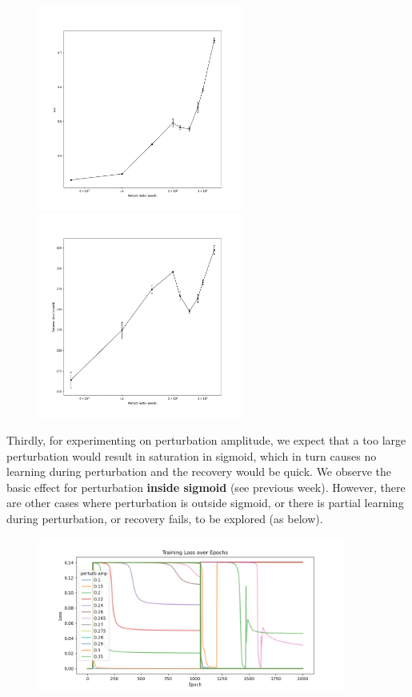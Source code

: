 \documentclass[12pt, a4paper]{article}
\begin{document}
\begin{figure}[H]
    \centering
    \includegraphics[width=0.6\textwidth]{FNN/fig/temp_abb05_perturb_auc_insigmoid.png} \\
    \includegraphics[width=0.6\textwidth]{FNN/fig/temp_abb05_perturb_rectime_insigmoid.png} \\
\end{figure}

Thirdly, for experimenting on perturbation amplitude, we expect that a too large perturbation would result in saturation in sigmoid, which in turn causes no learning during perturbation and the recovery would be quick. We observe the basic effect for perturbation \textbf{inside sigmoid} (see previous week). However, there are other cases where perturbation is outside sigmoid, or there is partial learning during perturbation, or recovery fails, to be explored (as below).

\begin{figure}[H]
    \centering
    \includegraphics[width=0.9\textwidth]{FNN/fig/temp_abb05_perturbamp_loss_outsigmoid.png} \\
\end{figure}
\end{document}

